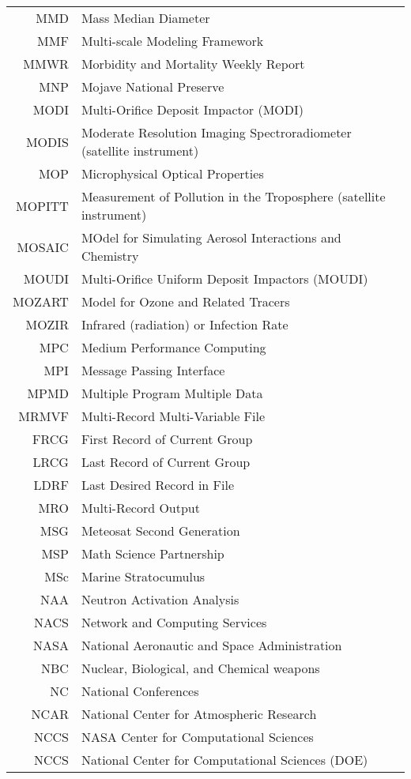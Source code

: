 \documentclass[12pt,twoside]{article}
\begin{document}
\begin{longtable}[>{\bfseries}l]{>{\ttfamily}r l}
MMD & Mass Median Diameter \\
MMF & Multi-scale Modeling Framework \\
MMWR & Morbidity and Mortality Weekly Report \\
MNP & Mojave National Preserve \\
MODI & Multi-Orifice Deposit Impactor (MODI) \\
MODIS &  Moderate Resolution Imaging Spectroradiometer (satellite instrument) \\
MOP & Microphysical Optical Properties \\
MOPITT & Measurement of Pollution in the Troposphere (satellite instrument) \\
MOSAIC & MOdel for Simulating Aerosol Interactions and Chemistry \\
MOUDI & Multi-Orifice Uniform Deposit Impactors (MOUDI) \\
MOZART & Model for Ozone and Related Tracers \\
MOZIR & Infrared (radiation) or Infection Rate \\
MPC & Medium Performance Computing \\
MPI & Message Passing Interface \\
MPMD & Multiple Program Multiple Data \\
MRMVF & Multi-Record Multi-Variable File \\
FRCG & First Record of Current Group \\
LRCG & Last Record of Current Group \\
LDRF & Last Desired Record in File \\
MRO & Multi-Record Output \\
MSG & Meteosat Second Generation \\
MSP & Math Science Partnership \\
MSc & Marine Stratocumulus \\
NAA & Neutron Activation Analysis \\
NACS & Network and Computing Services \\
NASA & National Aeronautic and Space Administration \\
NBC & Nuclear, Biological, and Chemical weapons \\
NC & National Conferences \\
NCAR & National Center for Atmospheric Research \\
NCCS & NASA Center for Computational Sciences \\
NCCS & National Center for Computational Sciences (DOE) \\

\end{longtable}
\end{document}

